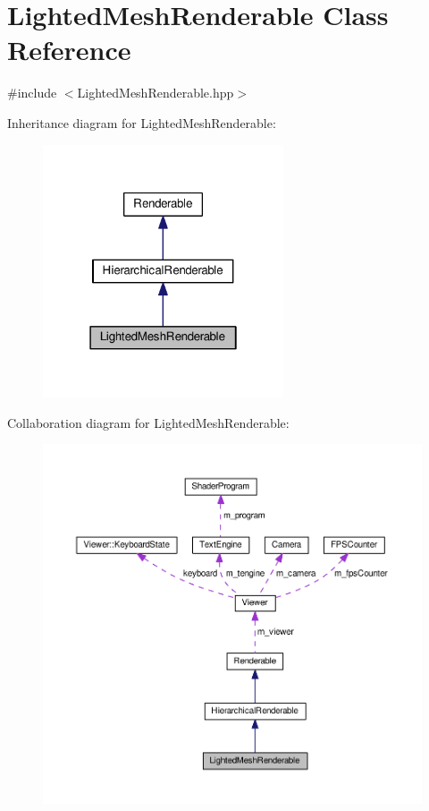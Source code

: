 \hypertarget{classLightedMeshRenderable}{\section{Lighted\+Mesh\+Renderable Class Reference}
\label{classLightedMeshRenderable}
}


{\ttfamily \#include $<$Lighted\+Mesh\+Renderable.\+hpp$>$}



Inheritance diagram for Lighted\+Mesh\+Renderable\+:\nopagebreak
\begin{figure}[H]
\begin{center}
\leavevmode
\includegraphics[width=202pt]{classLightedMeshRenderable__inherit__graph}
\end{center}
\end{figure}


Collaboration diagram for Lighted\+Mesh\+Renderable\+:\nopagebreak
\begin{figure}[H]
\begin{center}
\leavevmode
\includegraphics[width=350pt]{classLightedMeshRenderable__coll__graph}
\end{center}
\end{figure}
